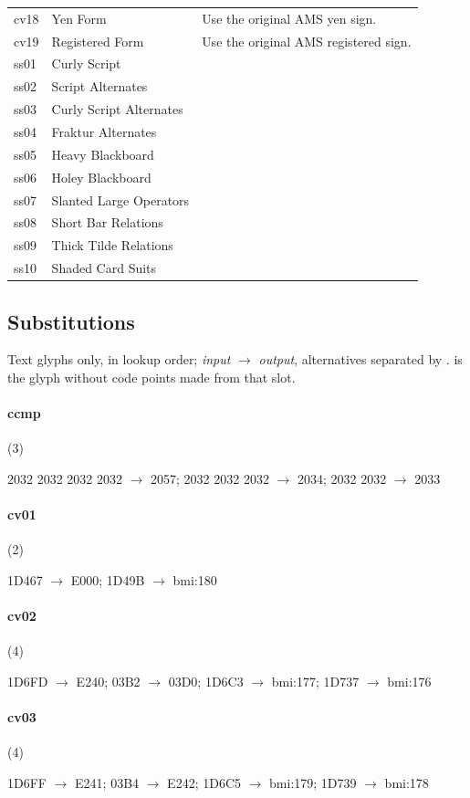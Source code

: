 \begin{longtable}{>{\ttfamily}lp{}p{}}
cv18 & Yen Form & Use the original AMS yen sign. \\
cv19 & Registered Form & Use the original AMS registered sign. \\
ss01 & Curly Script &  \\
ss02 & Script Alternates &  \\
ss03 & Curly Script Alternates &  \\
ss04 & Fraktur Alternates &  \\
ss05 & Heavy Blackboard &  \\
ss06 & Holey Blackboard &  \\
ss07 & Slanted Large Operators &  \\
ss08 & Short Bar Relations &  \\
ss09 & Thick Tilde Relations &  \\
ss10 & Shaded Card Suits &  \\
\bottomrule
\end{longtable}

\subsection*{Substitutions}

Text glyphs only, in lookup order; \emph{input} $\to$ \emph{output},
alternatives separated by \textbar.   is the glyph without code
points made from that slot.

\paragraph{ccmp} (3)
\raggedright\small 2032 2032 2032 2032 $\to$ 2057; 2032 2032 2032 $\to$ 2034;
2032 2032 $\to$ 2033\par

\paragraph{cv01} (2)
\raggedright\small 1D467 $\to$ E000; 1D49B $\to$ bmi:180\par

\paragraph{cv02} (4)
\raggedright\small 1D6FD $\to$ E240; 03B2 $\to$ 03D0; 1D6C3 $\to$ bmi:177;
1D737 $\to$ bmi:176\par

\paragraph{cv03} (4)
\raggedright\small 1D6FF $\to$ E241; 03B4 $\to$ E242; 1D6C5 $\to$ bmi:179;
1D739 $\to$ bmi:178\par

